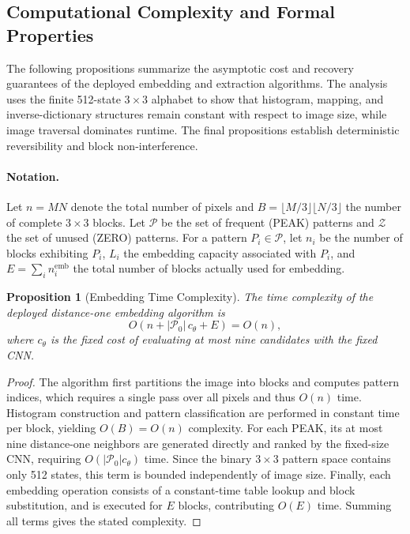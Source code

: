 \documentclass[a4paper,fleqn]{cas-dc}
\newtheorem{proposition}{Proposition}[section]
\newcommand{\RevisionAddBegin}{\begingroup}
\newcommand{\RevisionAddEnd}{\endgroup}
\newcommand{\RevisionAddBegin}{\begingroup\color{revisionblue}}
\newcommand{\RevisionAddEnd}{\endgroup}
\begin{document}
\subsection{Computational Complexity and Formal Properties}
\label{subsec:complexity-analysis}

\RevisionAddBegin
The following propositions summarize the asymptotic cost and recovery
guarantees of the deployed embedding and extraction algorithms. The analysis
uses the finite 512-state $3\times3$ alphabet to show that histogram, mapping,
and inverse-dictionary structures remain constant with respect to image size,
while image traversal dominates runtime. The final propositions establish
deterministic reversibility and block non-interference.
\RevisionAddEnd

\paragraph{Notation.}
Let $n=MN$ denote the total number of pixels and
$B=\lfloor M/3\rfloor\lfloor N/3\rfloor$ the number of complete
$3\times3$ blocks.
Let $\mathcal{P}$ be the set of frequent (PEAK) patterns and
$\mathcal{Z}$ the set of unused (ZERO) patterns.
For a pattern $P_i \in \mathcal{P}$, let $n_i$ be the number of blocks
exhibiting $P_i$, $L_i$ the embedding capacity associated with $P_i$, and
$E = \sum_i n_i^{\text{emb}}$ the total number of blocks actually used for
embedding.

\begin{proposition}[Embedding Time Complexity]
The time complexity of the deployed distance-one embedding algorithm is
\begin{equation}
O\!\left(n+|\mathcal P_0|\,c_\theta+E\right)=O(n),
\label{eq:embedding-complexity}
\end{equation}
where $c_\theta$ is the fixed cost of evaluating at most nine candidates with
the fixed CNN.
\end{proposition}

\begin{proof}
The algorithm first partitions the image into blocks and computes pattern
indices, which requires a single pass over all pixels and thus $O(n)$ time.
Histogram construction and pattern classification are performed in constant
time per block, yielding $O(B)=O(n)$ complexity.
For each PEAK, its at most nine distance-one neighbors are generated directly
and ranked by the fixed-size CNN, requiring
$O(|\mathcal P_0|c_\theta)$ time. Since the binary $3\times3$ pattern space
contains only 512 states, this term is bounded independently of image size.
Finally, each embedding operation consists of a constant-time table lookup and
block substitution, and is executed for $E$ blocks, contributing $O(E)$ time.
Summing all terms gives the stated complexity.
\end{proof}
\end{document}
